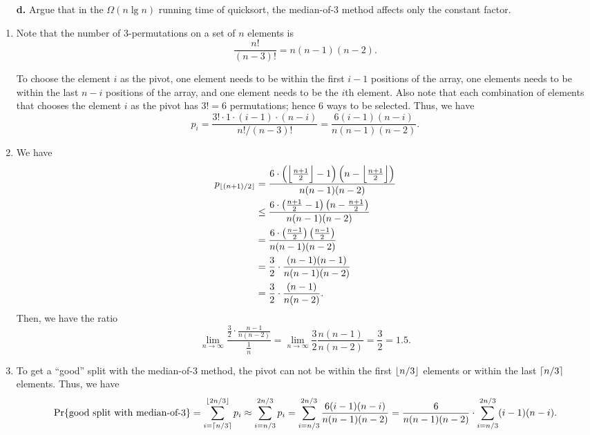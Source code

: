 \begin{enumerate}
{\begin{enumerate}
\item[\textbf{d.}]{Argue that in the $\Omega(n \lg n)$ running time of
quicksort, the median-of-3 method affects only the constant factor.}
\end{enumerate}
}

\begin{framed}
\begin{enumerate}
\item{Note that the number of 3-permutations on a set of $n$ elements is
\[
  \frac{n!}{(n - 3)!} = n (n - 1) (n - 2).
\]

To choose the element $i$ as the pivot, one element needs to be within the first
$i - 1$ positions of the array, one elements needs to be within the last $n - i$
positions of the array, and one element needs to be the $i$th element. Also note
that each combination of elements that chooses the element $i$ as the pivot has
$3! = 6$ permutations; hence 6 ways to be selected. Thus, we have
\[
  p_i = \frac{3! \cdot 1 \cdot (i - 1) \cdot (n - i)}{n!/(n - 3)!} = \frac{6 (i - 1) (n - i)}{n (n - 1) (n - 2)}.
\]}
\item{We have
\begin{equation*}
\begin{aligned}
p_{\lfloor(n + 1)/2\rfloor}
  &=   \frac{6 \cdot \left(\Bigl\lfloor\frac{n + 1}{2}\Bigr\rfloor - 1\right)
                     \left(n - \Bigl\lfloor\frac{n + 1}{2}\Bigr\rfloor\right)}{n (n - 1) (n - 2)}\\
&\le \frac{6 \cdot \left(\frac{n + 1}{2} - 1\right) \left(n - \frac{n + 1}{2}\right)}{n (n - 1) (n - 2)}\\
&=   \frac{6 \cdot \left(\frac{n - 1}{2}\right) \left(\frac{n - 1}{2}\right)}{n (n - 1) (n - 2)}\\
&=   \frac{3}{2} \cdot \frac{(n - 1) (n - 1)}{n (n - 1) (n - 2)}\\
&=   \frac{3}{2} \cdot \frac{(n - 1)}{n (n - 2)}.
\end{aligned}
\end{equation*}
Then, we have the ratio
\[
\lim_{n\to\infty} \frac{\frac{3}{2} \cdot \frac{n - 1}{n (n - 2)}}{\frac{1}{n}}
= \lim_{n\to\infty} \frac{3}{2} \frac{n (n - 1)}{n (n - 2)} = \frac{3}{2} = 1.5.
\]
}
\item{To get a ``good'' split with the median-of-3 method, the pivot can not be
within the first $\lfloor n/3\rfloor$ elements or within the last $\lceil n/3\rceil$
elements. Thus, we have
\[
\text{Pr}\{\text{good split with median-of-3}\} = \sum_{i = \lceil n/3\rceil}^{\lfloor2n/3\rfloor} p_i
\approx \sum_{i = n/3}^{2n/3} p_i
= \sum_{i = n/3}^{2n/3} \frac{6 (i - 1) (n - i)}{n (n - 1) (n - 2)}
= \frac{6}{n (n - 1) (n - 2)} \cdot \sum_{i = n/3}^{2n/3} (i - 1) (n - i).
\]

}
\end{enumerate}
\end{framed}
\end{enumerate}
